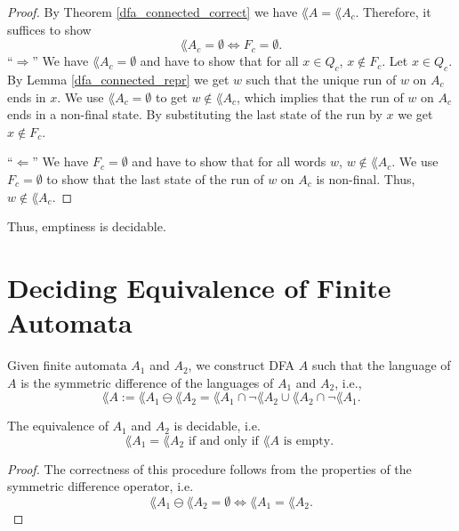 \begin{proof}
    By Theorem \ref{dfa_connected_correct} we have $\lang{A} = \lang{A_c}$.
    Therefore, it suffices to show
    \begin{equation*}
        \lang{A_c} = \emptyset \iff F_c = \emptyset.
    \end{equation*}
    ``$\Rightarrow$''
    We have $\lang{A_c} = \emptyset$ and have to show that for all $x \in Q_c$, $x \notin F_c$.
    Let $x \in Q_c$. 
    By Lemma \ref{dfa_connected_repr} we get $w$ such that the unique run of $w$ on $A_c$
    ends in $x$. 
    We use $\lang{A_c} = \emptyset$ to get $w \notin \lang{A_c}$, 
    which implies that the run of $w$ on $A_c$ ends in a non-final state.
    By substituting the last state of the run by $x$ we get $x \notin F_c$.

    ``$\Leftarrow$''
    We have $F_c = \emptyset$ and have to show that for all words $w$, $w \notin \lang{A_c}$.
    We use $F_c = \emptyset$ to show that the last state of the run of $w$ on $A_c$ is non-final.
    Thus, $w \notin \lang{A_c}$.

\end{proof}

    Thus, emptiness is decidable.






\section{Deciding Equivalence of Finite Automata}
Given finite automata $A_1$ and $A_2$, we construct DFA $A$ such that the language of $A$ is the symmetric difference of the languages of $A_1$ and $A_2$, i.e.,
\begin{equation*}          
    \lang{A} := \lang{A_1} \ominus \lang{A_2} = \lang{A_1} \cap \neg \lang{A_2} \cup \lang{A_2} \cap \neg \lang{A_1}.      
\end{equation*}
\begin{theorem} The equivalence of $A_1$ and $A_2$ is decidable, i.e.
    \label{dfa_equiv_correct}
    \begin{equation*}                
        \lang{A_1} = \lang{A_2} \mbox{ if and only if } \lang{A} \mbox{ is empty. }                
    \end{equation*}
\end{theorem}
\begin{proof}
    The correctness of this procedure follows from the properties of the symmetric difference operator, i.e.
    \begin{equation*}                  
        \lang{A_1} \ominus \lang{A_2} = \emptyset \Leftrightarrow \lang{A_1} = \lang{A_2}.                  
    \end{equation*}
\end{proof}

